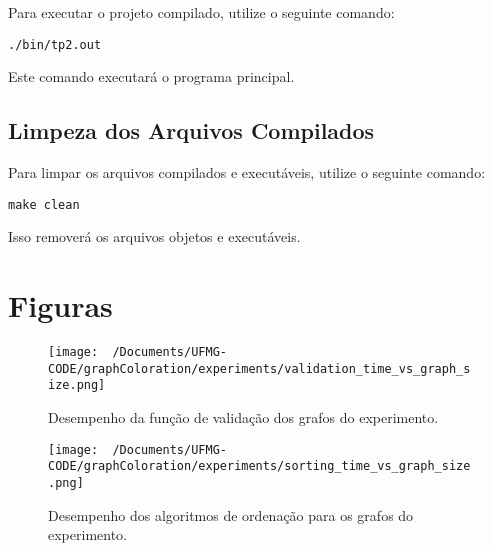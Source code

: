 \documentclass{article}
\begin{document}
Para executar o projeto compilado, utilize o seguinte comando:

\begin{verbatim}
./bin/tp2.out
\end{verbatim}

Este comando executará o programa principal.


\subsection{Limpeza dos Arquivos Compilados}

Para limpar os arquivos compilados e executáveis, utilize o seguinte comando:

\begin{verbatim}
make clean
\end{verbatim}

Isso removerá os arquivos objetos e executáveis.

\newpage
\section{Figuras}

\begin{figure}[H]
    \begin{minipage}{\textwidth}
        \centering
        \texttt{[image: ~/Documents/UFMG-CODE/graphColoration/experiments/validation\_time\_vs\_graph\_size.png]}
        \caption{Desempenho da função de validação dos grafos do experimento.}
        \label{fig:validacao}
    \end{minipage}
\end{figure}

\vspace{1cm}

\begin{figure}[H]
    \begin{minipage}{\textwidth}
        \centering
        \texttt{[image: ~/Documents/UFMG-CODE/graphColoration/experiments/sorting\_time\_vs\_graph\_size.png]}
        \caption{Desempenho dos algoritmos de ordenação para os grafos do experimento.}
        \label{fig:ordenacao}
    \end{minipage}
\end{figure}

\label{ap:figuras}
\end{document}
